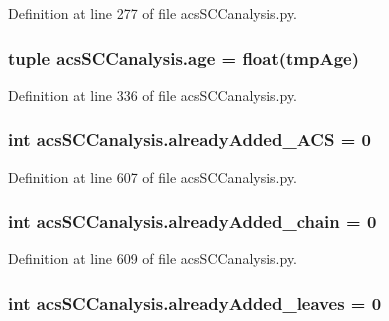 Definition at line 277 of file acs\-S\-C\-Canalysis.\-py.

\hypertarget{a00128_a98baad82b74a27e8b8c58aa985b7d374}{
\subsubsection[{age}]{\setlength{\rightskip}{0pt plus 5cm}tuple acs\-S\-C\-Canalysis.\-age = float(tmp\-Age)}}\label{a00128_a98baad82b74a27e8b8c58aa985b7d374}


Definition at line 336 of file acs\-S\-C\-Canalysis.\-py.

\hypertarget{a00128_a38f20e6b1cad6a61f1c9b87b37c76f63}{
\subsubsection[{already\-Added\-\_\-\-A\-C\-S}]{\setlength{\rightskip}{0pt plus 5cm}int acs\-S\-C\-Canalysis.\-already\-Added\-\_\-\-A\-C\-S = 0}}\label{a00128_a38f20e6b1cad6a61f1c9b87b37c76f63}


Definition at line 607 of file acs\-S\-C\-Canalysis.\-py.

\hypertarget{a00128_ac1b286545469555eb284f9b5f2bd984f}{
\subsubsection[{already\-Added\-\_\-chain}]{\setlength{\rightskip}{0pt plus 5cm}int acs\-S\-C\-Canalysis.\-already\-Added\-\_\-chain = 0}}\label{a00128_ac1b286545469555eb284f9b5f2bd984f}


Definition at line 609 of file acs\-S\-C\-Canalysis.\-py.

\hypertarget{a00128_ac842390795cf193351c795945cde8e77}{
\subsubsection[{already\-Added\-\_\-leaves}]{\setlength{\rightskip}{0pt plus 5cm}int acs\-S\-C\-Canalysis.\-already\-Added\-\_\-leaves = 0}}\label{a00128_ac842390795cf193351c795945cde8e77}


